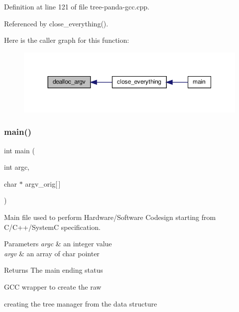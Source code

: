 Definition at line 121 of file tree-\/panda-\/gcc.\+cpp.



Referenced by close\+\_\+everything().

Here is the caller graph for this function\+:
\nopagebreak
\begin{figure}[H]
\begin{center}
\leavevmode
\includegraphics[width=350pt]{d5/d39/tree-panda-gcc_8cpp_acbcf6c3a420303b78ac2a91fd7a6484a_icgraph}
\end{center}
\end{figure}
\mbox{\label{tree-panda-gcc_8cpp_a3f558354c40ef4683081b73e38fc7bc4}} 
\subsubsection{\texorpdfstring{main()}{main()}}
{\footnotesize\ttfamily int main (\begin{DoxyParamCaption}\item[{int}]{argc,  }\item[{char $\ast$}]{argv\+\_\+orig\mbox{[}$\,$\mbox{]} }\end{DoxyParamCaption})}



Main file used to perform Hardware/\+Software Codesign starting from C/\+C++/\+SystemC specification. 


\begin{DoxyParams}{Parameters}
{\em argc} & an integer value \\
\hline
{\em argv} & an array of char pointer \\
\hline
\end{DoxyParams}
\begin{DoxyReturn}{Returns}
The main ending status 
\end{DoxyReturn}
G\+CC wrapper to create the raw

creating the tree manager from the data structure 

